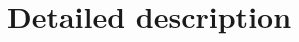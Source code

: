 \documentclass[a4paper,11pt,twoside]{report}
\begin{document}
\chapter{Detailed description}\label{detaileddescription}
%
%
\end{document}
